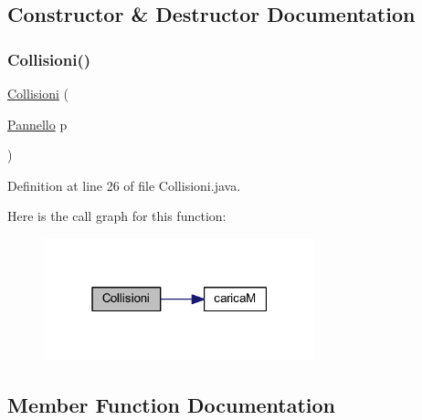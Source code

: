 \subsection{Constructor \& Destructor Documentation}
\mbox{\label{classa_1_1survival_1_1game_1_1_collisioni_a65b3180595586bc591f7689883e01c7e}} 
\subsubsection{\texorpdfstring{Collisioni()}{Collisioni()}}
{\footnotesize\ttfamily \hyperlink{classa_1_1survival_1_1game_1_1_collisioni}{Collisioni} (\begin{DoxyParamCaption}\item[{\hyperlink{classa_1_1survival_1_1game_1_1_pannello}{Pannello}}]{p }\end{DoxyParamCaption})}



Definition at line 26 of file Collisioni.\+java.

Here is the call graph for this function\+:
\nopagebreak
\begin{figure}[H]
\begin{center}
\leavevmode
\includegraphics[width=223pt]{classa_1_1survival_1_1game_1_1_collisioni_a65b3180595586bc591f7689883e01c7e_cgraph}
\end{center}
\end{figure}


\subsection{Member Function Documentation}
\mbox{\label{classa_1_1survival_1_1game_1_1_collisioni_a373d83d9b42d31e72ccc982a3fd85ea9}} 
